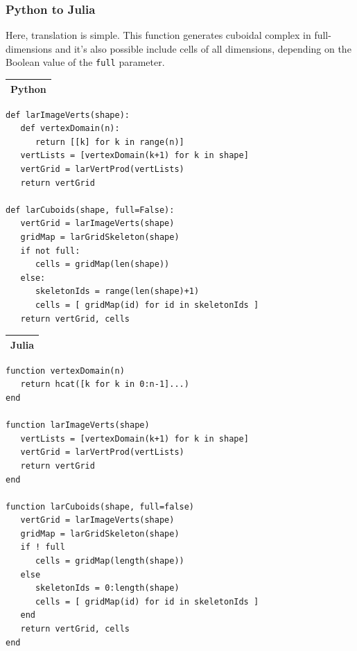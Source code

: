 \documentclass{article}
\begin{document}
\subsubsection{Python to Julia}
Here, translation is simple. This function generates cuboidal complex in full-dimensions and it's also possible include cells of all dimensions, depending on the Boolean value of the \texttt{full} parameter.
\vspace{1ex}
\begin{flushleft} \small
\begin{center}
\begin{tabular}{|p{16cm}|}
\hline
\cellcolor[gray]{.9}Python\\
\hline
\end{tabular}
\end{center}
\vspace{2ex}
\begin{list}{}{} \item
\begin{Verbatim}[tabsize=4]
def larImageVerts(shape):
   def vertexDomain(n): 
      return [[k] for k in range(n)]
   vertLists = [vertexDomain(k+1) for k in shape]
   vertGrid = larVertProd(vertLists)
   return vertGrid

def larCuboids(shape, full=False):
   vertGrid = larImageVerts(shape)
   gridMap = larGridSkeleton(shape)
   if not full: 
      cells = gridMap(len(shape))
   else:
      skeletonIds = range(len(shape)+1)
      cells = [ gridMap(id) for id in skeletonIds ]
   return vertGrid, cells
\end{Verbatim}
\end{list}
\begin{center}
\vspace{2ex}
\begin{tabular}{|p{16cm}|}
\hline
\cellcolor[gray]{.9}Julia\\
\hline
\end{tabular}
\end{center}
\vspace{2ex}
\begin{list}{}{} \item
\begin{Verbatim}[tabsize=4]
function vertexDomain(n)
   return hcat([k for k in 0:n-1]...)
end

function larImageVerts(shape)
   vertLists = [vertexDomain(k+1) for k in shape]
   vertGrid = larVertProd(vertLists)
   return vertGrid
end

function larCuboids(shape, full=false)
   vertGrid = larImageVerts(shape)
   gridMap = larGridSkeleton(shape)
   if ! full
      cells = gridMap(length(shape))
   else
      skeletonIds = 0:length(shape)
      cells = [ gridMap(id) for id in skeletonIds ]
   end
   return vertGrid, cells
end
\end{Verbatim}
\end{list}

\end{flushleft}
\end{document}
